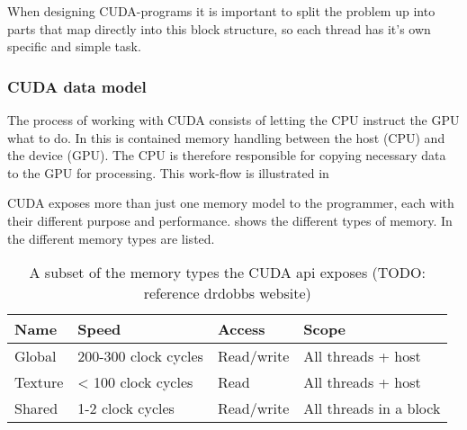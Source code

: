 \newpage
{}

When designing CUDA-programs it is important to split the problem up into parts that map directly into this block structure, so each thread has it's own specific and simple task.


\newpage
\subsubsection{CUDA data model}
The process of working with CUDA consists of letting the CPU instruct the GPU what to do. In this is contained memory handling between the host (CPU) and the device (GPU). The CPU is therefore responsible for copying necessary data to the GPU for processing. This work-flow is illustrated in 


CUDA exposes more than just one memory model to the programmer, each with their different purpose and performance.  shows the different types of memory. In  the different memory types are listed.

\begin{table}[htb]
	\centering
	\begin{tabular}{llll}
		\toprule
		Name 	& Speed & Access & Scope\\
		\midrule
		Global 	& 200-300 clock cycles 	& Read/write & All threads + host \\
		Texture 	& < 100 clock cycles & Read & All threads + host\\
		Shared 	& 1-2 clock cycles & Read/write & All threads in a block\\
		\bottomrule
	\end{tabular}
	\caption{A subset of the memory types the CUDA api exposes (TODO: reference drdobbs website)}
	\label{cudamemtable}
\end{table}

